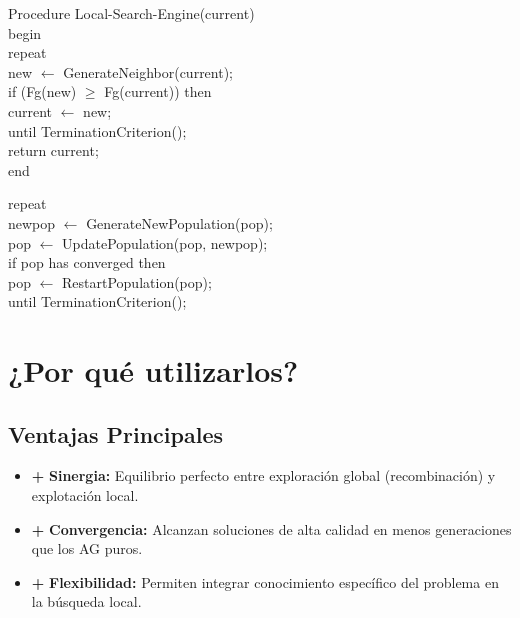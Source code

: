 \documentclass[notumble,10pt]{leaflet}
\begin{document}
\begin{tcolorbox}[accentbox, title=\textbf{>}\_ Pseudocódigo: Búsqueda Local, fontupper=\small\ttfamily]
\begin{flushleft}
Procedure Local-Search-Engine(current)\\
begin\\
\hspace*{0.5cm}repeat\\
\hspace*{1.0cm}new $\leftarrow$ GenerateNeighbor(current);\\
\hspace*{1.0cm}if (Fg(new) $\geq$ Fg(current)) then\\
\hspace*{1.5cm}current $\leftarrow$ new;\\
\hspace*{0.5cm}until TerminationCriterion();\\
\hspace*{0.5cm}return current;\\
end
\end{flushleft}
\end{tcolorbox}

\begin{tcolorbox}[accentbox, title=\textbf{<>} Ciclo de Población, fontupper=\small\ttfamily]
\begin{flushleft}
repeat\\
\hspace*{0.5cm}newpop $\leftarrow$ GenerateNewPopulation(pop);\\
\hspace*{0.5cm}pop $\leftarrow$ UpdatePopulation(pop, newpop);\\
\hspace*{0.5cm}if pop has converged then\\
\hspace*{1.0cm}pop $\leftarrow$ RestartPopulation(pop);\\
until TerminationCriterion();
\end{flushleft}
\end{tcolorbox}

\newpage

\section{¿Por qué utilizarlos?}

\subsection{Ventajas Principales}
\begin{itemize}[leftmargin=*, itemsep=2pt]
    \item \textbf{+} \textbf{Sinergia:} Equilibrio perfecto entre exploración global (recombinación) y explotación local.
    \item \textbf{+} \textbf{Convergencia:} Alcanzan soluciones de alta calidad en menos generaciones que los AG puros.
    \item \textbf{+} \textbf{Flexibilidad:} Permiten integrar conocimiento específico del problema en la búsqueda local.
\end{itemize}
\end{document}
